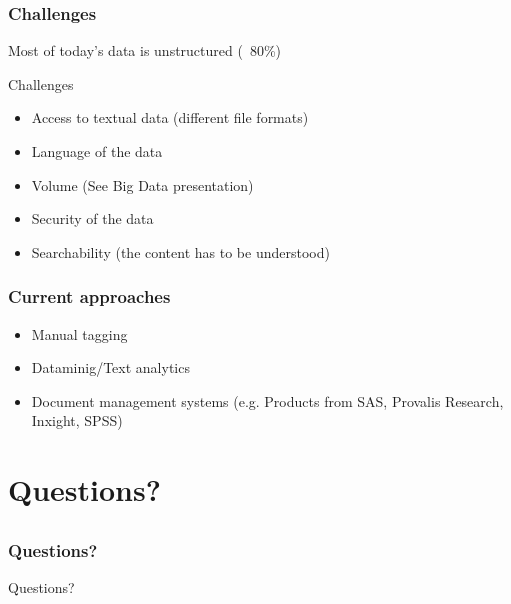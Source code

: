\documentclass{beamer}
\begin{document}
\begin{frame}
	\frametitle{Challenges}
	Most of today's data is unstructured (~80\%)
	\begin{block}{Challenges}
	\begin{itemize}
		\item Access to textual data (different file formats)
		\item Language of the data
		\item Volume (See Big Data presentation)
		\item Security of the data
		\item Searchability (the content has to  be understood)
	\end{itemize}
	\end{block}

\end{frame}

\begin{frame}
	\frametitle{Current approaches}
	\begin{itemize}
		\item Manual tagging
		\item Dataminig/Text analytics
		\item Document management systems (e.g. Products from SAS, Provalis Research, Inxight, SPSS)
	\end{itemize}
\end{frame}

\section{Questions?}
\subsection*{}

\begin{frame}
	\frametitle{Questions?}
	\begin{center}
		\large Questions?
	\end{center}
\end{frame}
\end{document}
